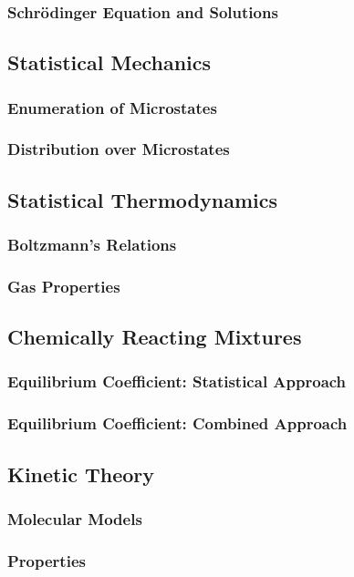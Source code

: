 \documentclass[12pt]{article}
\begin{document}
\subsubsection{Schr{\"o}dinger Equation and Solutions}

\subsection{Statistical Mechanics}
\subsubsection{Enumeration of Microstates}
\subsubsection{Distribution over Microstates}

\subsection{Statistical Thermodynamics}
\subsubsection{Boltzmann's Relations}
\subsubsection{Gas Properties}

\subsection{Chemically Reacting Mixtures}
\subsubsection{Equilibrium Coefficient: Statistical Approach}
\subsubsection{Equilibrium Coefficient: Combined Approach}

\subsection{Kinetic Theory}
\subsubsection{Molecular Models}
\subsubsection{Properties}
\end{document}

